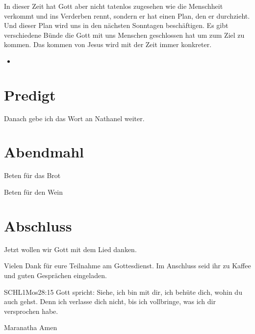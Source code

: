 \documentclass{../../inc/mybib}
\begin{document}
\begin{spacing}{1.5}
\begin{block}[Paradies]
        In dieser Zeit hat Gott aber nicht tatenlos zugesehen wie die Menschheit verkommt und ins Verderben rennt, sondern er hat einen Plan, den er durchzieht. Und dieser Plan wird uns in den nächsten Sonntagen beschäftigen. Es gibt verschiedene Bünde die Gott mit uns Menschen geschlossen hat um zum Ziel zu kommen. Das kommen von Jesus wird mit der Zeit immer konkreter.
        \begin{itemize}
            \item 
        \end{itemize}
    \end{block}
    \begin{block}
    \end{block}
    \begin{block}
    \end{block}
    \begin{block}
    \end{block}
    \begin{block}
    \end{block}
    \begin{block}
    \end{block}

\end{spacing}

\section{Predigt}

Danach gebe ich das Wort an Nathanel weiter.



\section{Abendmahl}

Beten für das Brot


Beten für den Wein


\section{Abschluss}

Jetzt wollen wir Gott mit dem Lied  danken.

Vielen Dank für eure Teilnahme am Gottesdienst. Im Anschluss seid ihr zu Kaffee und guten Gesprächen eingeladen.
\beten{}

\begin{bibelbox}{SCHL}{1Mos}{28:15}
Gott spricht: Siehe, ich bin mit dir,
ich behüte dich, wohin du auch gehst.
Denn ich verlasse dich nicht,
bis ich vollbringe, was ich dir versprochen habe.
\end{bibelbox}

Maranatha Amen
\end{document}
